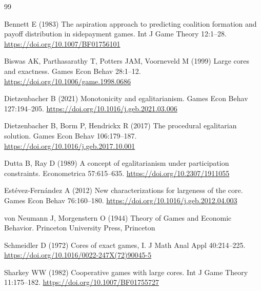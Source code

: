 \documentclass[11pt]{article}
\begin{document}
\begin{thebibliography}{99}

Bennett E (1983) The aspiration approach to predicting coalition formation
and payoff distribution in sidepayment games.
Int J Game Theory 12:1--28.
\url{https://doi.org/10.1007/BF01756101}

Biswas AK, Parthasarathy T, Potters JAM, Voorneveld M (1999) Large cores
and exactness. Games Econ Behav 28:1--12.
\url{https://doi.org/10.1006/game.1998.0686}

Dietzenbacher B (2021) Monotonicity and egalitarianism.
Games Econ Behav 127:194--205.
\url{https://doi.org/10.1016/j.geb.2021.03.006}

Dietzenbacher B, Borm P, Hendrickx R (2017) The procedural egalitarian
solution. Games Econ Behav 106:179--187.
\url{https://doi.org/10.1016/j.geb.2017.10.001}

Dutta B, Ray D (1989) A concept of egalitarianism under participation
constraints. Econometrica 57:615--635.
\url{https://doi.org/10.2307/1911055}

Est\'evez-Fern\'andez A (2012) New characterizations for largeness of the
core. Games Econ Behav 76:160--180.
\url{https://doi.org/10.1016/j.geb.2012.04.003}

von Neumann J, Morgenstern O (1944) Theory of Games and Economic Behavior.
Princeton University Press, Princeton

Schmeidler D (1972) Cores of exact games, I.
J Math Anal Appl 40:214--225.
\url{https://doi.org/10.1016/0022-247X(72)90045-5}

Sharkey WW (1982) Cooperative games with large cores.
Int J Game Theory 11:175--182.
\url{https://doi.org/10.1007/BF01755727}

\end{thebibliography}
\end{document}
